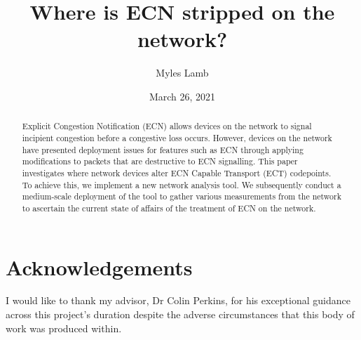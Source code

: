 \documentclass{l4proj}
\begin{document}
\title{Where is ECN stripped on the network?}
\author{Myles Lamb}
\date{March 26, 2021}

\maketitle

\begin{abstract}
    
 Explicit Congestion Notification (ECN) allows devices on the network to signal incipient congestion before a congestive loss occurs. However, devices on the network have presented deployment issues for features such as ECN through applying modifications to packets that are destructive to ECN signalling. This paper investigates where network devices alter ECN Capable Transport (ECT) codepoints. To achieve this, we implement a new network analysis tool. We subsequently conduct a medium-scale deployment of the tool to gather various measurements from the network to ascertain the current state of affairs of the treatment of ECN on the network. 
    
\end{abstract}

\chapter*{Acknowledgements}

I would like to thank my advisor, Dr Colin Perkins, for his exceptional guidance across this project's duration despite the adverse circumstances that this body of work was produced within.


\def\consentname {Myles Lamb} %
\def\consentdate {26 March 2021} %

\educationalconsent


\tableofcontents
\end{document}

